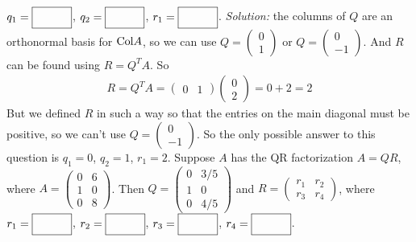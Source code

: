     $q_1 = \framebox{\strut\hspace{1cm}}$, 
    $q_2 = \framebox{\strut\hspace{1cm}}$, 
    $r_1 = \framebox{\strut\hspace{1cm}}$.
    \ifnum {} {\color{DarkBlue} \textit{Solution:} the columns of $Q$ are an orthonormal basis for $\text{Col} A$, so we can use $Q = \begin{pmatrix} 0\\1\end{pmatrix}$ or $Q = \begin{pmatrix} 0\\-1\end{pmatrix}$. And $R$ can be found using $R=Q^TA$. So 
    \begin{align}
        R = Q^TA = \begin{pmatrix} 0 & 1 \end{pmatrix}\begin{pmatrix} 0\\2\end{pmatrix} = 0 + 2 = 2
    \end{align} But we defined $R$ in such a way so that the entries on the main diagonal must be positive, so we can't use $Q = \begin{pmatrix} 0\\-1\end{pmatrix}$. So the only possible answer to this question is $q_1 = 0$, $q_2 = 1$, $r_1 = 2$.
    }\fi    
\fi 
\ifnum {}
    Suppose $A$ has the QR factorization $A=QR$, where $A = \begin{pmatrix} 0&6\\1&0\\0&8\end{pmatrix}$. Then $Q = \begin{pmatrix} 0&3/5\\1&0\\0&4/5\end{pmatrix}$ and $R=\begin{pmatrix} r_1&r_2\\r_3&r_4\end{pmatrix}$, where 
    $r_1=\framebox{\strut\hspace{1cm}}$, 
    $r_2=\framebox{\strut\hspace{1cm}}$, 
    $r_3=\framebox{\strut\hspace{1cm}}$, 
    $r_4=\framebox{\strut\hspace{1cm}}$.
    
